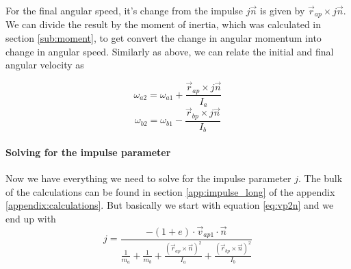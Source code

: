 For the final angular speed, it's change from the impulse $j\vec n$ is given by
$\vec r_{ap} \times j \vec n$. We can divide the result by the moment of
inertia, which was calculated in section \ref{sub:moment}, to get convert the
change in angular momentum into change in angular speed. Similarly as above, we
can relate the initial and final angular velocity as

\begin{equation}
	\label{eq:omega_a2}
	\omega_{a2} = \omega_{a1} + \frac{\vec r_{ap} \times j\vec n}{I_a}
\end{equation}
\begin{equation}
	\label{eq:omega_b2}
	\omega_{b2} = \omega_{b1} - \frac{\vec r_{bp} \times j\vec n}{I_b}
\end{equation}

\paragraph{Solving for the impulse parameter}
Now we have everything we need to solve for the impulse parameter $j$. The bulk
of the calculations can be found in section \ref{app:impulse_long} of the
appendix \ref{appendix:calculations}. But basically we start with equation
\ref{eq:vp2n} and we end up with
\begin{equation}
	\label{eq:j}
	j = \frac{ - (1+e) \cdot \vec v_{ap1} \cdot \vec n }{\frac{1}{m_a} + \frac{1}{m_b} +
		\frac{\left( \vec r_{ap} \times \vec n \right)^2}{I_a} + \frac{\left( \vec
			r_{bp} \times \vec n \right)^2}{I_b}}
\end{equation}
